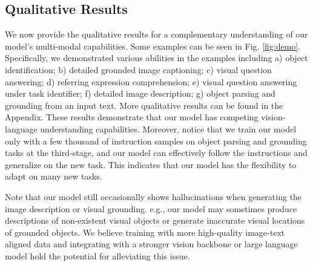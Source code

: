 \subsection{Qualitative Results}
We now provide the qualitative results for a complementary understanding of our model's multi-modal capabilities. Some examples can be seen in Fig. \ref{fig:demo}. Specifically, we demonstrated various abilities in the examples including a) object identification; b) detailed grounded image captioning; c) visual question answering; d) referring expression comprehension; e) visual question answering under task identifier; f) detailed image description; g) object parsing and grounding from an input text. More qualitative results can be found in the Appendix. These results demonstrate that our model has competing vision-language understanding capabilities. Moreover, notice that we train our model only with a few thousand of instruction samples on object parsing and grounding tasks at the third-stage, and our model can effectively follow the instructions and generalize on the new task. This indicates that our model has the flexibility to adapt on many new tasks.


Note that our model still occasionally shows hallucinations when generating the image description or visual grounding. e.g., our model may sometimes produce descriptions of non-existent visual objects or generate inaccurate visual locations of grounded objects. We believe training with more high-quality image-text aligned data and integrating with a stronger vision backbone or large language model hold the potential for alleviating this issue. 





















































%
